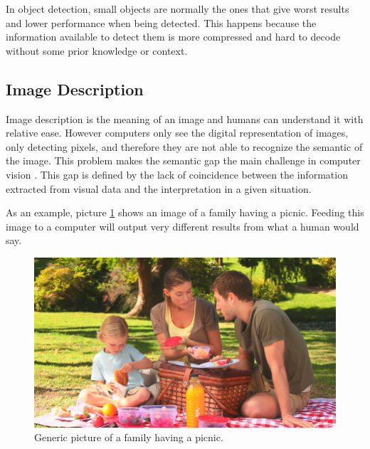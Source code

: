     \par In object detection, small objects are normally the ones that give  worst results and lower performance when being detected. This happens because the information available to detect them is more compressed and hard to decode without some prior knowledge or context. \cite{Agarwal2019}

    
    \subsection{Image Description}


    \par Image description is the meaning of an image and humans can understand it with relative ease. However computers only see the digital representation of images, only detecting pixels, and therefore they are not able to recognize the semantic of the image. This problem makes the semantic gap the main challenge in computer vision \cite{Huang2012}. This gap is defined by the lack of coincidence between the information extracted from visual data and the interpretation in a given situation. \cite{Agarwal2019}
    


    \par As an example, picture \ref{fig:picnic} shows an image of a family having a picnic. Feeding this image to a computer will output very different results from what a human would say.

    \begin{figure}[htb]
        \centering
        \includegraphics[scale = 0.35]{Sections/2StateOfTheArt/2_images/picinic.png}
        \caption{Generic picture of a family having a picnic.}
        \label{fig:picnic}  
    \end{figure}

